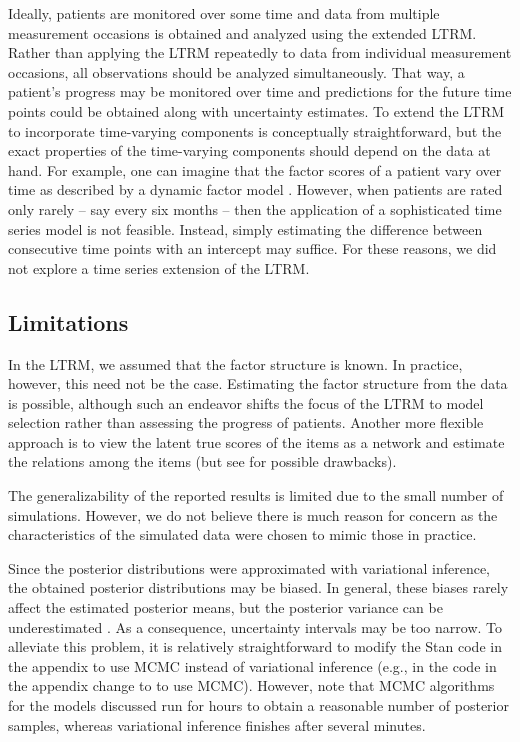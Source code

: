 \documentclass[a4paper,usenames,dvipsnames]{article}
\newenvironment{revision}{\color{teal}}{\color{black}}
\begin{document}
Ideally, patients are monitored over some time and data from multiple measurement occasions is obtained and analyzed using the extended LTRM. Rather than applying the LTRM repeatedly to data from individual measurement occasions, all observations should be analyzed simultaneously. That way, a patient's progress may be monitored over time and predictions for the future time points could be obtained along with uncertainty estimates. To extend the LTRM to incorporate time-varying components is conceptually straightforward, but the exact properties of the time-varying components should depend on the data at hand. For example, one can imagine that the factor scores of a patient vary over time as described by a dynamic factor model \cite{molenaar1985dynamic, forni2000generalized}. However, when patients are rated only rarely -- say every six months -- then the application of a sophisticated time series model is not feasible. Instead, simply estimating the difference between consecutive time points with an intercept may suffice. For these reasons, we did not explore a time series extension of the LTRM.

\subsection*{Limitations}

In the LTRM, we assumed that the factor structure is known. In practice, however, this need not be the case. Estimating the factor structure from the data is possible, although such an endeavor shifts the focus of the LTRM to model selection rather than assessing the progress of patients. Another more flexible approach is to view the latent true scores of the items as a network and estimate the relations among the items (but see  for possible drawbacks).

\begin{revision}The generalizability of the reported results is limited due to the small number of simulations. However, we do not believe there is much reason for concern as the characteristics of the simulated data were chosen to mimic those in practice.\end{revision}

Since the posterior distributions were approximated with variational inference, the obtained posterior distributions may be biased. In general, these biases rarely affect the estimated posterior means, but the posterior variance can be underestimated \cite{blei2017variational}. As a consequence, uncertainty intervals may be too narrow. To alleviate this problem, it is relatively straightforward to modify the Stan code in the appendix to use MCMC instead of variational inference (e.g., in the code in the appendix change  to  to use MCMC). However, note that MCMC algorithms for the models discussed run for hours to obtain a reasonable number of posterior samples, whereas variational inference finishes after several minutes.
\end{document}
